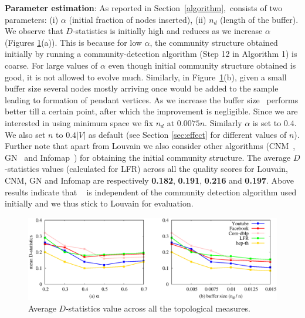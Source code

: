 {\bf Parameter estimation}:
As reported in Section~\ref{algorithm},~\compas consists of two parameters: (i) $\alpha$ (initial fraction of nodes inserted), (ii) $n_d$ (length of the buffer).
We observe that $D$-statistics is initially high and reduces as we increase $\alpha$ (Figures \ref{param_est}(a)). This is because for low $\alpha$, the community structure obtained initially by running a community-detection algorithm (Step 12 in Algorithm 1) is coarse. For large values of $\alpha$ even though initial community structure obtained is good, it is not allowed to evolve much. Similarly, in Figure~\ref{param_est}(b), given a small buffer size several nodes mostly arriving once would be added to the sample leading to formation of pendant vertices. As we increase the buffer size \compas~performs better till a certain point, after which the improvement is negligible. Since we are interested in using minimum space we fix $n_d$ at $0.0075 n$. Similarly $\alpha$ is set to $0.4$. 
We also set $n$ to $0.4|V|$ as default (see Section \ref{sec:effect} for different values of $n$). Further note that apart from Louvain we also consider other algorithms (CNM~\cite{clauset2004finding}, GN~\cite{girvan2002community} and Infomap~\cite{rosvall2008maps}) for obtaining the initial community structure. 
The average $D$-statistics values (calculated for LFR) across all the quality scores for Louvain, CNM, GN and Infomap are respectively \textbf{0.182}, \textbf{0.191}, \textbf{0.216} and \textbf{0.197}. 
Above results indicate that \compas~ is independent of the community detection algorithm used initially and we thus stick to Louvain for evaluation.

\begin{figure}[!h]
\centering
\includegraphics[width=\columnwidth]{./texfiles/Chapter_2/figures/param_estimate.eps}
\caption{\label{param_est}Average $D$-statistics value across all the topological measures.}
\vspace{3mm}
\end{figure}


